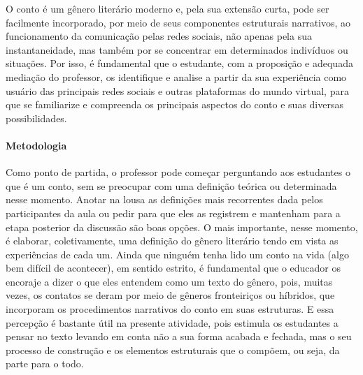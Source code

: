 \documentclass[12pt]{extarticle}
\begin{document}
O conto é um gênero literário moderno e, pela sua extensão curta, pode
ser facilmente incorporado, por meio de seus componentes estruturais
narrativos, ao funcionamento da comunicação pelas redes sociais, não
apenas pela sua instantaneidade, mas também por se concentrar em
determinados indivíduos ou situações. Por isso, é fundamental que o
estudante, com a proposição e adequada mediação do professor, os
identifique e analise a partir da sua experiência como usuário das
principais redes sociais e outras plataformas do mundo virtual, para que
se familiarize e compreenda os principais aspectos do conto e suas
diversas possibilidades.

\paragraph{Metodologia}

Como ponto de partida, o professor pode começar
perguntando aos estudantes o que é um conto, sem se preocupar com uma
definição teórica ou determinada nesse momento. Anotar na lousa as
definições mais recorrentes dada pelos participantes da aula ou pedir
para que eles as registrem e mantenham para a etapa posterior da
discussão são boas opções. O mais importante, nesse momento, é elaborar,
coletivamente, uma definição do gênero literário tendo em vista as
experiências de cada um. Ainda que ninguém tenha lido um conto na vida
(algo bem difícil de acontecer), em sentido estrito, é fundamental que o
educador os encoraje a dizer o que eles entendem como um texto do
gênero, pois, muitas vezes, os contatos se deram por meio de gêneros
fronteiriços ou híbridos, que incorporam os procedimentos narrativos do
conto em suas estruturas. E essa percepção é bastante útil na presente
atividade, pois estimula os estudantes a pensar no texto levando em
conta não a sua forma acabada e fechada, mas o seu processo de
construção e os elementos estruturais que o compõem, ou seja, da parte
para o todo.
\end{document}
